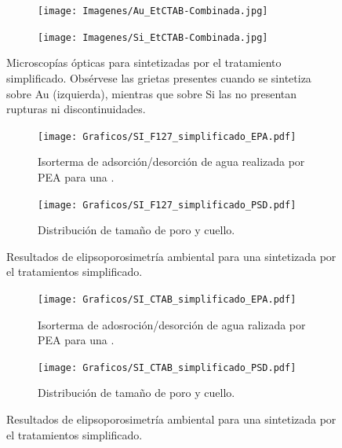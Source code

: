 \begin{figure}[th!]
			 \label{fig:Microscopia_F127_simplificado}	
	 		\vspace*{1cm}
 	   	    \begin{subfigure}{0.495\textwidth}
	       	\texttt{[image: Imagenes/Au\_EtCTAB-Combinada.jpg]}
	   		\end{subfigure}
	   		\begin{subfigure}{0.495\textwidth}
	   	    \texttt{[image: Imagenes/Si\_EtCTAB-Combinada.jpg]}
	   		\end{subfigure}
			 \caption[Microscopías \pdmC\space tratamiento simplificado.]{Microscopías ópticas para \pdmC\space sintetizadas por el tratamiento simplificado. Obsérvese las grietas presentes cuando se sintetiza sobre Au (izquierda), mientras que sobre Si las \pdmC\space no presentan rupturas ni discontinuidades.}
			 \label{fig:Microscopia_CTAB_simplificado}	
		     \end{figure}	
		
	  	 \begin{figure}
			  	\begin{subfigure}{0.495\textwidth}
			  	\texttt{[image: Graficos/SI\_F127\_simplificado\_EPA.pdf]}
				\caption{Isorterma de adsorción/desorción de agua realizada por PEA para una \pdmF.}
				\label{fig:F127_simplificado_EPA}
				\end{subfigure}
				\begin{subfigure}{0.495\textwidth}
			  	\texttt{[image: Graficos/SI\_F127\_simplificado\_PSD.pdf]}
				\caption{Distribución de tamaño de poro y cuello.\\ }
				\label{fig:F127_simplificado_PSD}
				\end{subfigure}
				\caption[Elipsoporosimetría \pdmF\space tratamiento simplificado.]{Resultados de elipsoporosimetría ambiental para una \pdmF\space sintetizada por el tratamientos simplificado.}
				\label{fig:F127_simplificado}
				\end{figure}
	
		  \begin{figure}	
			\begin{subfigure}{0.495\textwidth}
		  	\texttt{[image: Graficos/SI\_CTAB\_simplificado\_EPA.pdf]}
			\caption{Isorterma de adosroción/desorción de agua ralizada por PEA para una \pdmC.}
			\label{fig:CTAB_simplificado_EPA}
			\end{subfigure}
			\begin{subfigure}{0.495\textwidth}
		  	\texttt{[image: Graficos/SI\_CTAB\_simplificado\_PSD.pdf]}
			\caption{Distribución de tamaño de poro y cuello.\\ }
			\label{fig:CTAB_simplificado_PSD}
			\end{subfigure}
			\caption[Elipsoporosimetría \pdmC\space tratamiento simplificado.]{Resultados de elipsoporosimetría ambiental para una \pdmC\space sintetizada por el tratamientos simplificado.}
			\end{figure}			

